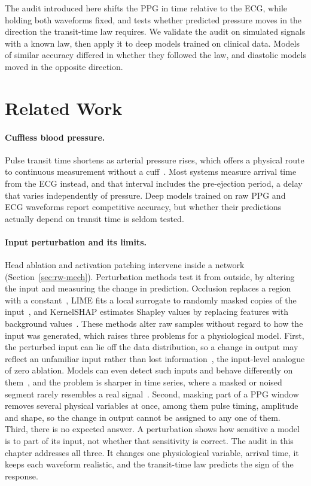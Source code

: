 The audit introduced here shifts the PPG in time relative to the ECG, while holding both waveforms fixed, and tests whether predicted pressure moves in the direction the transit-time law requires. We validate the audit on simulated signals with a known law, then apply it to deep models trained on clinical data. Models of similar accuracy differed in whether they followed the law, and diastolic models moved in the opposite direction.

\section{Related Work}
\label{sec:audit-rw}

\paragraph{Cuffless blood pressure.}
Pulse transit time shortens as arterial pressure rises, which offers a physical route to continuous measurement without a cuff~\citep{mukkamala2015toward}. Most systems measure arrival time from the ECG instead, and that interval includes the pre-ejection period, a delay that varies independently of pressure. Deep models trained on raw PPG and ECG waveforms report competitive accuracy, but whether their predictions actually depend on transit time is seldom tested.

\paragraph{Input perturbation and its limits.}
Head ablation and activation patching intervene inside a network (Section~\ref{sec:rw-mech}).
Perturbation methods test it from outside, by altering the input and
measuring the change in prediction. Occlusion replaces a region with a
constant~\cite{zeiler2014visualizing}, LIME fits a local surrogate to
randomly masked copies of the input~\cite{ribeiro2016why}, and KernelSHAP
estimates Shapley values by replacing features with background
values~\cite{lundberg2017unified}. These methods alter raw samples without
regard to how the input was generated, which raises three problems for a
physiological model. First, the perturbed input can lie off the data
distribution, so a change in output may reflect an unfamiliar input
rather than lost information~\cite{hooker2019benchmark,hase2021ood}, the
input-level analogue of zero ablation. Models can even detect such inputs
and behave differently on them~\cite{slack2020fooling}, and the problem is
sharper in time series, where a masked or noised segment rarely resembles
a real signal~\cite{ismail2020benchmarking}. Second, masking part of a PPG
window removes several physical variables at once, among them pulse
timing, amplitude and shape, so the change in output cannot be assigned
to any one of them. Third, there is no expected answer. A perturbation
shows how sensitive a model is to part of its input, not whether that
sensitivity is correct. The audit in this chapter addresses all three. It
changes one physiological variable, arrival time, it keeps each waveform
realistic, and the transit-time law predicts the sign of the response.

